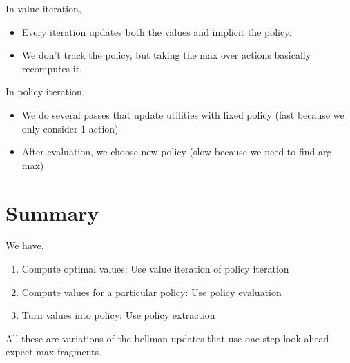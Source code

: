In value iteration, 
\begin{itemize}
    \item Every iteration updates both the values and implicit the policy.
    \item We don't track the policy, but taking the max over actions basically recomputes it.
\end{itemize}

In policy iteration, 
\begin{itemize}
    \item We do several passes that update utilities with fixed policy (fast because we only consider 1 action)
    \item After evaluation, we choose new policy (slow because we need to find arg max)
\end{itemize}


\section{Summary}
We have, 
\begin{enumerate}
    \item Compute optimal values: Use value iteration of policy iteration 
    \item Compute values for a particular policy: Use policy evaluation
    \item Turn values into policy: Use policy extraction
\end{enumerate}

All these are variations of the bellman updates that use one step look ahead expect max fragments.
